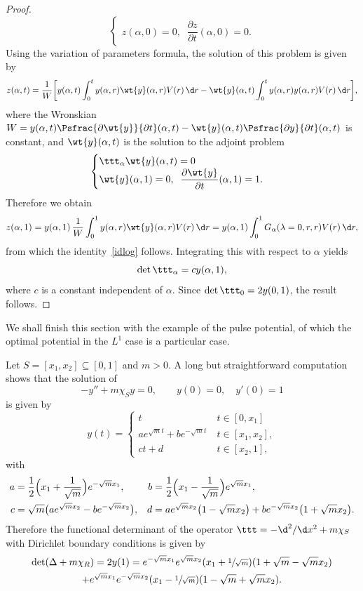 \begin{proof}
\begin{equation*}
\begin{cases}
z(\alpha,0)=0, \;\; \dfrac{\partial z}{\partial t} (\alpha, 0)=0.
\end{cases}
\end{equation*}
Using the variation of parameters formula, the solution of this problem is given by
\[
z(\alpha,t)= \frac{1}{W} \biggl[y(\alpha,t) \int_0^t y(\alpha,r)
\wt{y}(\alpha,r)V(r) \,\d r
- \wt{y}(\alpha,t) \int_0^t y(\alpha,r) y(\alpha,r)V(r) \,\d r \biggr],
\]
where the Wronskian $W = y(\alpha,t) \Psfrac{\partial\wt{y}}{\partial t}(\alpha,t)
-\wt{y}(\alpha,t) \Psfrac{\partial y}{\partial t}(\alpha,t)$ is constant, and
$\wt{y}(\alpha,t)$ is the solution to the adjoint problem
\begin{equation*}
\begin{cases}
\ttt_{\alpha} \wt{y}(\alpha,t) =0\\
\wt{y}(\alpha,1)=0, \;\; \dfrac{\partial\wt{y}}{\partial t} (\alpha, 1)= 1.
\end{cases}
\end{equation*}
Therefore we obtain
\[
z(\alpha,1) = y(\alpha,1)\, \frac{1}{W} \int_0^1 y(\alpha,r) \wt{y}(\alpha,r)V(r)
\,\d r =
y(\alpha,1) \int_0^1 G_{\alpha}(\lambda=0,r,r) V(r) \,\d r,
\]
from which the identity~\eqref{idlog} follows. Integrating this with respect to $\alpha$ yields
\[
\det\ttt_{\alpha} = c y(\alpha,1),
\]
where $c$ is a constant independent of $\alpha$. Since $\det\ttt_{0} = 2 y(0,1)$, the result follows.
\end{proof}

We shall finish this section with the example of the pulse potential, of which the optimal potential in the $L^1$ case is
a particular case.
\begin{expl}
Let $S=[x_1,x_2]\subseteq [0,1]$ and $m>0$. A long but straightforward computation shows that the solution of
\[
-y'' + m \chi_S y = 0, \quad \quad y(0)=0, \quad y'(0)=1
\]
is given by
\[
y(t)= \begin{cases}
t & \ t \in [0,x_1]\\
a e^{\sqrt{m}t} + b e^{-\sqrt{m}t} & \ t \in [x_1,x_2],\\
c t + d & \ t \in [x_2,1],
\end{cases}
\]
with
\begin{align*}
a &= \frac{1}{2} \Bigl(x_1 + \frac{1}{\sqrt{m}}\Bigr) e^{-\sqrt{m}x_1}, & 
b &= \frac{1}{2} \Bigl(x_1 - \frac{1}{\sqrt{m}}\Bigr) e^{\sqrt{m}x_1},\\
c &= \sqrt{m} \bigl(a e^{\sqrt{m}x_2} -b e^{-\sqrt{m}x_2}\bigr), & 
d &= a e^{\sqrt{m}x_2} \bigl(1-\sqrt{m}x_2 \bigr) + b e^{-\sqrt{m}x_2} \bigl(1+\sqrt{m}x_2 \bigr).
\end{align*}
Therefore the functional determinant of the operator
$\ttt = -\d^2/\d x^2 + m \chi_S$ with Dirichlet boundary conditions is given by
\begin{multline*}
\det(\Delta + m \chi_R) = 2 y(1) = e^{-\sqrt{m}x_1} e^{\sqrt{m}x_2} (x_1 + \sfrac{1}{\sqrt{m}}) (1 + \sqrt{m} - \sqrt{m}x_2) \\
+ e^{\sqrt{m}x_1} e^{-\sqrt{m}x_2} (x_1 - \sfrac{1}{\sqrt{m}}) (1 - \sqrt{m} + \sqrt{m}x_2).
\end{multline*}
\end{expl}

